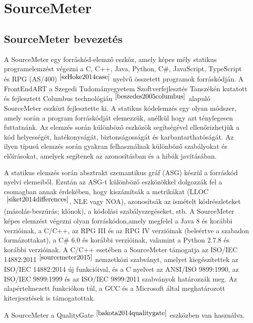 \chapter{SourceMeter}\label{chap:SourceMeter}

\section{SourceMeter bevezetés}

\noindent

A SourceMeter egy forráskód-elemző eszköz, amely képes mély statikus programelemzést végezni a C, C++, Java, Python, C\#, JavaScript, TypeScript és RPG (AS/400)$^{~\cite{szHoke2014case}}$
nyelvű összetett programok forráskódján.
A FrontEndART a Szegedi Tudományegyetem Szoftverfejlesztés Tanszékén kutatott és fejlesztett Columbus technológián$^{~\cite{beszedes2005columbus}}$ alapuló SourceMeter eszközt fejlesztette ki.
A statikus kódelemzés egy olyan módszer, amely során a program forráskódját elemezzük, anélkül hogy azt ténylegesen futtatnánk.
Az elemzés során különböző eszközök segítségével ellenőrizhetjük a kód helyességét, hatékonyságát, biztonságosságát és karbantarthatóságát.
Az ilyen típusú elemzés során gyakran felhasználnak különböző szabályokat és előírásokat, amelyek segítenek az azonosításban és a hibák javításában.

\noindent

A statikus elemzés során absztrakt szemantikus gráf (ASG) készül a forráskód nyelvi elemeiből.
Ezután az ASG-t különböző eszközökkel dolgozzák fel a csomagban annak érdekében, hogy kiszámítsák a metrikákat (LLOC$^{~\cite{siket2014differences}}$, NLE vagy NOA),
azonosítsák az ismételt kódrészleteket (másolás-beszúrás; klónok), a kódolási szabályszegéseket, stb.
A SourceMeter képes elemzést végezni olyan forráskódon,amely megfelel a Java 8 és korábbi verzióinak, a C/C++,
az RPG III és az RPG IV verzióinak (beleértve a szabadon formázottakat), a C\# 6.0 és korábbi verzióinak, valamint a Python 2.7.8 és korábbi verzióinak.
A C/C++ esetében a SourceMeter támogatja az ISO/IEC 14882:2011$^{~\cite{sourcemeter2015}}$ nemzetközi szabványt, amelyet kiegészítettek az ISO/IEC 14882:2014 új funkcióival, és a C nyelvet az ANSI/ISO 9899:1990, az ISO/IEC 9899:1999 és az ISO/IEC 9899:2011 szabványok határozzák meg.
Az alapértelmezett funkciókon túl, a GCC és a Microsoft által meghatározott kiterjesztések is támogatottak.

\noindent

A SourceMeter a QualityGate$^{~\cite{bakota2014qualitygate}}$ eszközben van használva.

